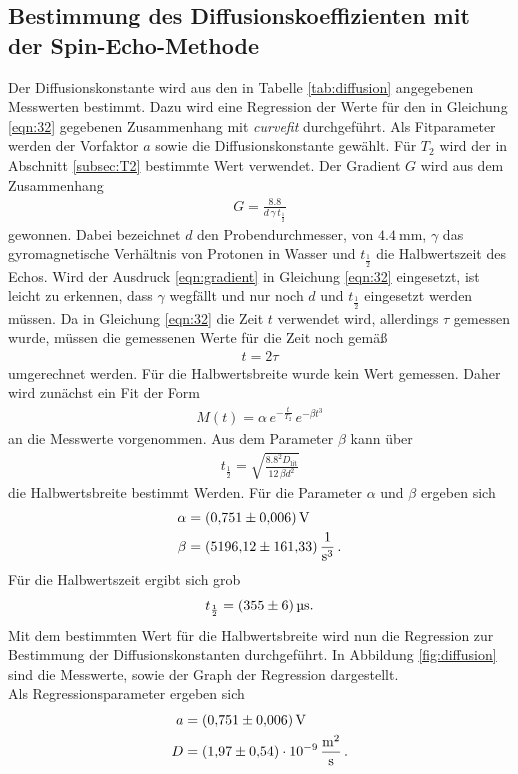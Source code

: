 \subsection{Bestimmung des Diffusionskoeffizienten mit der Spin-Echo-Methode}
\label{subsec:D}
Der Diffusionskonstante wird aus den in Tabelle \ref{tab:diffusion} angegebenen
Messwerten bestimmt.
Dazu wird eine Regression der Werte für den in Gleichung \eqref{eqn:32} gegebenen Zusammenhang mit
\textit{curvefit} durchgeführt.
Als Fitparameter werden der Vorfaktor $a$ sowie die Diffusionskonstante gewählt. Für $T_{2}$ wird der in Abschnitt
\ref{subsec:T2} bestimmte Wert verwendet. Der Gradient $G$ wird aus dem Zusammenhang
\begin{align}
  \label{eqn:gradient}
  G = \frac{8.8}{d \, \gamma \, t_{\frac{1}{2}}}
\end{align}
gewonnen. Dabei bezeichnet $d$ den Probendurchmesser, von $\SI{4.4}{\milli\meter}$, $\gamma$ das gyromagnetische Verhältnis
von Protonen in Wasser und $t_{\frac{1}{2}}$ die Halbwertszeit des Echos.
Wird der Ausdruck \eqref{eqn:gradient} in Gleichung \eqref{eqn:32} eingesetzt, ist leicht zu erkennen, dass $\gamma$ wegfällt und
nur noch $d$ und $t_{\frac{1}{2}}$ eingesetzt werden müssen.
Da in Gleichung \eqref{eqn:32} die Zeit $t$ verwendet wird, allerdings $\tau$ gemessen wurde, müssen
die gemessenen Werte für die Zeit noch gemäß
\begin{align}
  t = 2 \tau
\end{align}
umgerechnet werden.
Für die Halbwertsbreite wurde kein Wert gemessen.
Daher wird zunächst ein Fit der Form
\begin{align}
  M(t) = \alpha \, e^{-\frac{t}{T_{2}}} \, e^{-\beta t^{3}}
\end{align}
an die Messwerte vorgenommen.
Aus dem Parameter $\beta$ kann über
\begin{align}
  t_{\frac{1}{2}} = \sqrt{\frac{8.8^{2} D_{\text{lit}}}{12 \, \beta d^{2} } }
\end{align}
die Halbwertsbreite bestimmt Werden.
Für die Parameter $\alpha$ und $\beta$ ergeben sich
\begin{align*}
  \alpha &= \SI{0.751+-0.006}{\volt}\\
  \beta &= \SI{5196.12+-161.33}{\per\second\cubed} \, .
\end{align*}
Für die Halbwertszeit ergibt sich grob
\begin{align*}
  t_{\frac{1}{2}} = \SI{355+-6}{\micro\second}.
\end{align*}
Mit dem bestimmten Wert für die Halbwertsbreite wird nun die Regression zur Bestimmung der Diffusionskonstanten durchgeführt.
In Abbildung \ref{fig:diffusion} sind die Messwerte, sowie der Graph der Regression dargestellt.\\
Als Regressionsparameter ergeben sich
\begin{align*}
  a &= \SI{0.751+-0.006}{\volt}\\
  D &= \SI{1.97+-0.54 e-9}{\meter\squared\per\second} \, .
\end{align*}

